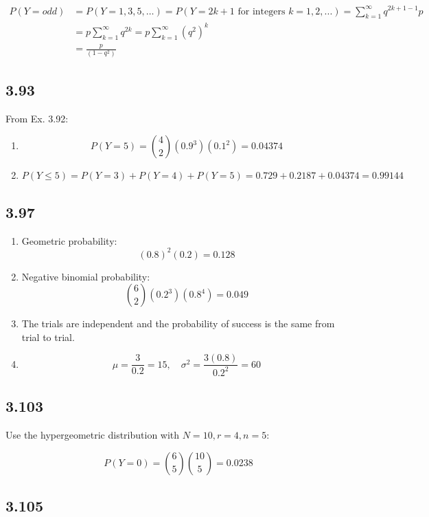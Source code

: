 \documentclass[
  letterpaper,
  DIV=11,
  numbers=noendperiod]{scrartcl}
\begin{document}
\[
\begin{aligned}
P(Y = odd) &= P(Y = 1, 3, 5, \ldots) = P(Y = 2k + 1 \text{ for integers } k = 1, 2, ...)= \sum_{k = 1}^{\infty} q^{2k + 1 - 1}p \\
&= p \sum_{k = 1}^{\infty} q^{2k} = p \sum_{k = 1}^{\infty} (q^2)^{k}\\
&= \frac{p}{(1-q^2)}
\end{aligned}
\]

\subsection{3.93}\label{section-4}

From Ex. 3.92:

\begin{enumerate}
\def\labelenumi{(\alph{enumi})}
\item
  \[P(Y = 5) = \binom{4}{2} (0.9^3)(0.1^2) = 0.04374\]
\item
  \[P(Y \leq 5) = P(Y=3) + P(Y=4) + P(Y=5) = 0.729 + 0.2187 + 0.04374 = 0.99144\]
\end{enumerate}

\subsection{3.97}\label{section-5}

\begin{enumerate}
\def\labelenumi{(\alph{enumi})}
\item
  Geometric probability:\\
  \[(0.8)^2 (0.2) = 0.128\]
\item
  Negative binomial probability:\\
  \[\binom{6}{2} (0.2^3)(0.8^4) = 0.049\]
\item
  The trials are independent and the probability of success is the same
  from trial to trial.
\item
  \[\mu = \frac{3}{0.2} = 15, \quad \sigma^2 = \frac{3(0.8)}{0.2^2} = 60\]
\end{enumerate}

\subsection{3.103}\label{section-6}

Use the hypergeometric distribution with \(N=10, r=4, n=5\):

\[P(Y=0) = \binom{6}{5}\binom{10}{5} = 0.0238\]

\subsection{3.105}\label{section-7}
\end{document}
